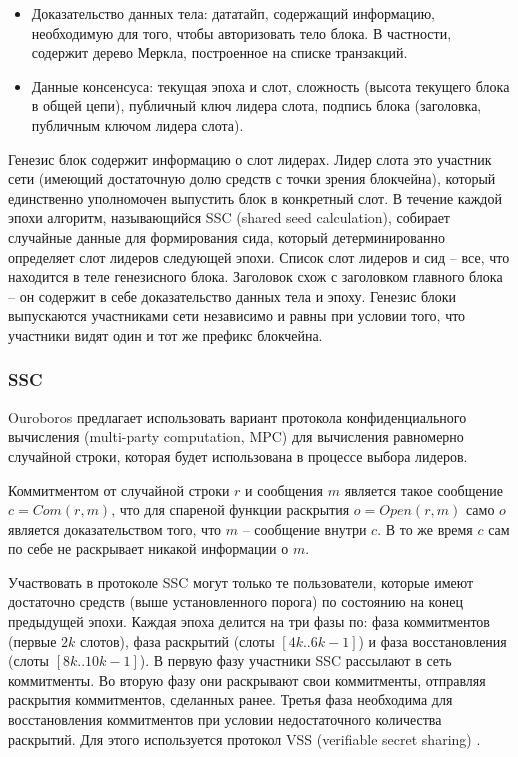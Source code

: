 \documentclass[specification,annotation]{itmo-student-thesis}
\begin{document}
\begin{itemize}
\item Доказательство данных тела: дататайп, содержащий информацию,
  необходимую для того, чтобы авторизовать тело блока. В частности,
  содержит дерево Меркла, построенное на списке транзакций.
\item Данные консенсуса: текущая эпоха и слот, сложность (высота
  текущего блока в общей цепи), публичный ключ лидера слота, подпись
  блока (заголовка, публичным ключом лидера слота).
\end{itemize}

Генезис блок содержит информацию о слот лидерах. Лидер слота это
участник сети (имеющий достаточную долю средств с точки зрения
блокчейна), который единственно уполномочен выпустить блок в
конкретный слот. В течение каждой эпохи алгоритм, называющийся SSC
(shared seed calculation), собирает случайные данные для формирования
сида, который детерминированно определяет слот лидеров следующей
эпохи. Список слот лидеров и сид -- все, что находится в теле
генезисного блока. Заголовок схож с заголовком главного блока -- он
содержит в себе доказательство данных тела и эпоху. Генезис блоки
выпускаются участниками сети независимо и равны при условии того, что
участники видят один и тот же префикс блокчейна.

\subsubsection{SSC}

Ouroboros предлагает использовать вариант протокола конфиденциального
вычисления (multi-party computation, MPC) для вычисления равномерно
случайной строки, которая будет использована в процессе выбора
лидеров.

Коммитментом от случайной строки $r$ и сообщения $m$ является такое
сообщение $c = Com(r,m)$, что для спареной функции раскрытия $o =
Open(r,m)$ само $o$ является доказательством того, что $m$ --
сообщение внутри $c$. В то же время $c$ сам по себе не раскрывает
никакой информации о $m$.

Участвовать в протоколе SSC могут только те пользователи, которые
имеют достаточно средств (выше установленного порога) по состоянию на
конец предыдущей эпохи. Каждая эпоха делится на три фазы по: фаза
коммитментов (первые $2k$ слотов), фаза раскрытий (слоты $[4k..6k-1]$)
и фаза восстановления (слоты $[8k..10k-1]$). В первую фазу участники
SSC рассылают в сеть коммитменты. Во вторую фазу они раскрывают свои
коммитменты, отправляя раскрытия коммитментов, сделанных ранее. Третья
фаза необходима для восстановления коммитментов при условии
недостаточного количества раскрытий. Для этого используется протокол
VSS (verifiable secret sharing) \cite{feldman1987practical}.
\end{document}
